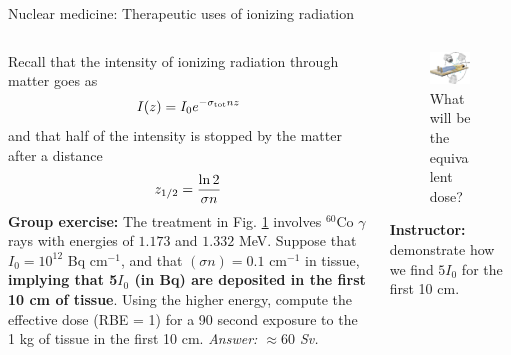 \documentclass{beamer}
\begin{document}
\begin{frame}{Nuclear medicine: Therapeutic uses of ionizing radiation}
\begin{columns}[T]
\begin{column}{0.6\textwidth}
\footnotesize
Recall that the intensity of ionizing radiation through matter goes as
\begin{equation}
I(z) = I_0 e^{-\sigma_{\rm tot} n z} \label{eq:I}
\end{equation}
and that half of the intensity is stopped by the matter after a distance
\begin{equation}
z_{\rm 1/2} = \frac{\ln 2}{\sigma n}
\end{equation}
\textbf{Group exercise:}  The treatment in Fig. \ref{fig:treatment_3} involves $^{60}$Co $\gamma$ rays with energies of $1.173$ and $1.332$ MeV.  Suppose that $I_0 = 10^{12}$ Bq cm$^{-1}$, and that $(\sigma n) = 0.1$ cm$^{-1}$ in tissue, \textbf{implying that 5$I_0$ (in Bq) are deposited in the first 10 cm of tissue}.  Using the higher energy, compute the effective dose (RBE = 1) for a 90 second exposure to the 1 kg of tissue in the first 10 cm.  \textit{Answer: $\approx 60$ Sv.}
\end{column}
\begin{column}{0.4\textwidth}
\footnotesize
\begin{figure}
\centering
\includegraphics[width=0.95\textwidth]{figures/radiation_treatment.png}
\caption{\label{fig:treatment_3} What will be the equivalent dose?}
\end{figure}
\textbf{\alert{Instructor:}} demonstrate how we find $5I_0$ for the first 10 cm.
\end{column}
\end{columns}
\end{frame}
\end{document}

